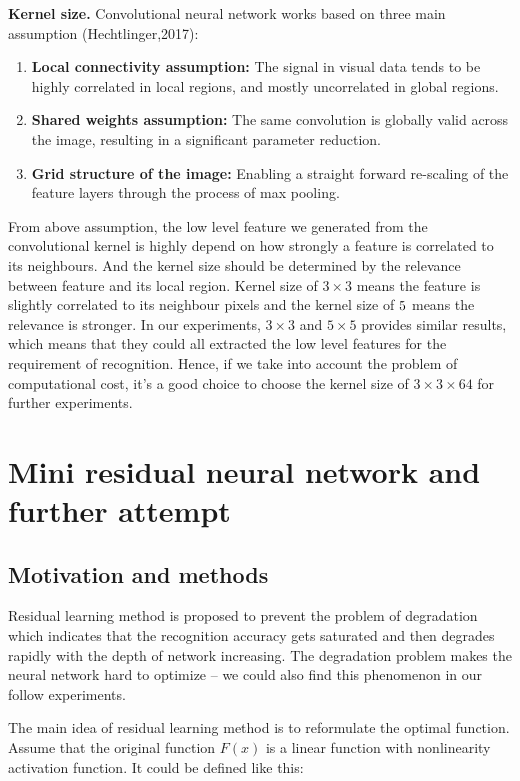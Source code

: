 \documentclass[]{article}
\begin{document}
\textbf{Kernel size.} Convolutional neural network works based on three main assumption (Hechtlinger,2017):

\begin{enumerate}
\item \textbf{Local connectivity assumption:}
The signal in visual data tends to be highly correlated in
local regions, and mostly uncorrelated in global regions.

\item \textbf{Shared weights assumption:}
The same convolution is globally valid across the image,
resulting in a significant parameter reduction.

\item \textbf{Grid structure of the image:}
Enabling a straight forward re-scaling of the feature layers
through the process of max pooling.
\end{enumerate}

From above assumption, the low level feature we generated from the convolutional kernel is highly depend on how strongly a feature is correlated to its neighbours. And the kernel size should be determined by the relevance between feature and its local region. Kernel size of $3 \times 3$ means the feature is slightly correlated to its neighbour pixels and the kernel size of $5 \time 5$ means the relevance is stronger. In our experiments, $3 \times 3$ and $5 \times 5$ provides similar results, which means that they could all extracted the low level features for the requirement of recognition. Hence, if we take into account the problem of computational cost, it's a good choice to choose the kernel size of $3\times 3\times 64$ for further experiments. 

\section{Mini residual neural network and further attempt}
\subsection{Motivation and methods}
Residual learning method is proposed to prevent the problem of degradation which indicates that the recognition accuracy gets saturated and then degrades rapidly with the depth of network increasing. The degradation problem makes the neural network hard to optimize -- we could also find this phenomenon in our follow experiments.

The main idea of residual learning method is to reformulate the optimal function. Assume that the original function $F(x)$ is a linear function with nonlinearity activation function. It could be defined like this:
\end{document}
